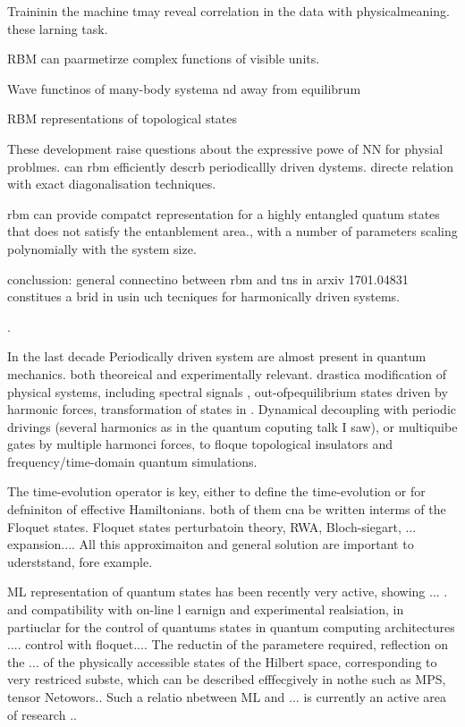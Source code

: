 \documentclass[pra,twocolumn,showkeys,preprintnumbers, amsmath,amssymb, aps,A4paper]{revtex4-1}
\begin{document}
Traininin the machine tmay reveal correlation in the data with physicalmeaning. these larning task.

RBM can paarmetirze complex functions of visible units. 



Wave functinos of many-body systema nd away from equilibrum

RBM representations of topological states


These development raise questions about the expressive powe  of NN for physial problmes. 
can rbm efficiently descrb periodicallly driven dystems. directe relation with exact diagonalisation techniques.


rbm can provide compatct representation for a highly entangled quatum states that does not satisfy the entanblement area., with a number of parameters scaling polynomially with the system size. 


conclussion: general connectino between rbm and tns in arxiv 1701.04831 constitues a brid in usin uch tecniques for harmonically driven systems.

.



In the last decade 
Periodically driven system are almost present in quantum mechanics. both theoreical and experimentally relevant. 
drastica modification of physical systems, including spectral signals \cite{} , 
out-ofpequilibrium states driven by harmonic forces, transformation of states in . Dynamical decoupling with periodic drivings (several harmonics as in the quantum coputing talk I saw), or multiquibe gates by multiple harmonci forces, to floque topological insulators and frequency/time-domain quantum simulations.

The time-evolution operator is key, either to define the time-evolution or for defniniton of effective Hamiltonians. both of them cna be written interms of the Floquet states. Floquet states perturbatoin theory, RWA, Bloch-siegart, ... expansion.... All this approximaiton and general solution are important to uderststand, fore example. 


ML representation of quantum states has been recently very active, showing ... . and compatibility with on-line l earnign and experimental realsiation, in partiuclar for the control of quantums states in quantum computing architectures .... control with floquet.... The reductin of the parametere required, reflection on the ... of the physically accessible states of the Hilbert space, corresponding to very restriced subste, which can be described efffecgively in nothe such as MPS, tensor Netowors.. Such a relatio nbetween ML and ... is currently an active area of research ..
\end{document}

